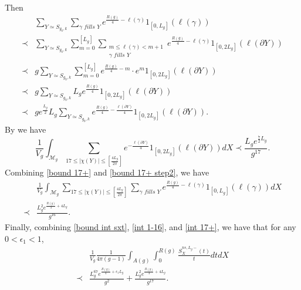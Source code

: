 \documentclass[11pt]{amsart}
\newcommand{\M}{\mathcal{M}}
\theoremstyle{plain}
\theoremstyle{definition}
\theoremstyle{remark}
\begin{document}
Then \begin{equation}\label{bound 17+}
\begin{aligned}
   &  \sum_{Y\simeq S_{g_0,k}}\sum_{\gamma \textit{ fills } Y}e^{\frac{R(g)}{4}-\ell(\gamma)}1_{[0,L_g]}(\ell(\gamma))\\
   \prec& \sum_{Y\simeq S_{g_0,k}} \sum_{m=0}^{[L_g]}\sum_{\substack{m\leq \ell(\gamma)<m+1\\
\gamma \textit{ fills } Y}} e^{\frac{R(g)}{4}-\ell(\gamma)} 1_{[0,2L_g]}(\ell(\partial 
 Y))\\
   \prec &g \sum_{Y\simeq S_{g_0,k}} \sum_{m=0}^{[L_g]} e^{\frac{R(g)}{4}-m}\cdot e^m 1_{[0,2L_g]}(\ell(\partial 
 Y))\\
   \prec & g\sum_{Y\simeq S_{g_0,k}}  L_g  e^{\frac{R(g)}{4}}1_{[0,2L_g]}(\ell(\partial 
 Y))\\
 \prec & ge^{\frac{L_g}{2}} L_g\sum_{Y\simeq S_{g_0,k}}   e^{\frac{R(g)}{4}-\frac{\ell(\partial Y)}{4}}1_{[0,2L_g]}(\ell(\partial 
 Y)).
   \end{aligned}
\end{equation}
By \cite[Proposition 33]{wu2022random} we have \begin{equation}\label{bound 17+ step2}
   \frac{1}{V_g} \int_{\M_g} \sum_{17\leq |\chi(Y)|\leq \left[\frac{4L_g}{2\pi}\right]}e^{-\frac{\ell(\partial Y)}{4}}1_{[0,2L_g]}(\ell(\partial 
 Y)) dX\prec\frac{L_ge^{\frac{7}{2}L_g}}{g^{17}}.
\end{equation}
Combining \eqref{bound 17+} and \eqref{bound 17+ step2}, we have \begin{equation}\label{int 17+}
\begin{aligned}
 &\frac{1}{V_g} \int_{\M_g} \sum_{17\leq |\chi(Y)|\leq \left[\frac{4L_g}{2\pi}\right]} \sum_{\gamma \textit{ fills } Y}e^{\frac{R(g)}{4}-\ell(\gamma)}1_{[0,L_g]}(\ell(\gamma)) dX\\
 \prec &\frac{L_g^2e^{\frac{R(g)}{4}+4L_g}}{g^{16}}.
 \end{aligned}
\end{equation}
Finally, combining \eqref{bound int sxt}, \eqref{int 1-16}, and \eqref{int 17+}, we have that for any $0<\epsilon_1<1$,
 \begin{equation}\label{bound nonsimple L_g-}
\begin{aligned} & \frac{1}{V_g} \frac{1}{4\pi(g-1)}\int_{A(g)} \int_0^{R(g)}\frac{S_X^{ns,L_g-}(t)}{t}dt dX \\
   \prec & \frac{L_g^{67}e^{\frac{R(g)}{4}+ \epsilon_1L_g } }{g^2}+\frac{L_g^2e^{\frac{R(g)}{4}+4L_g}}{g^{17}}.
\end{aligned}
\end{equation}
\end{document}
